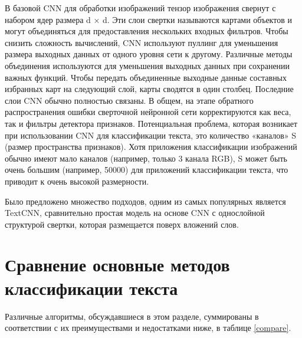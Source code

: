 В базовой CNN для обработки изображений тензор изображения свернут с набором ядер размера d × d. Эти слои свертки называются картами объектов и могут объединяться для предоставления нескольких входных фильтров\cite{168}. Чтобы снизить сложность вычислений, CNN используют пуллинг для уменьшения размера выходных данных от одного уровня сети к другому. Различные методы объединения используются для уменьшения выходных данных при сохранении важных функций\cite{188}. Чтобы передать объединенные выходные данные составных избранных карт на следующий слой, карты сводятся в один столбец. Последние слои CNN обычно полностью связаны. В общем, на этапе обратного распространения ошибки сверточной нейронной сети корректируются как веса, так и фильтры детектора признаков. Потенциальная проблема, которая возникает при использовании CNN для классификации текста, это количество «каналов» S (размер пространства признаков). Хотя приложения классификации изображений обычно имеют мало каналов (например, только 3 канала RGB), S может быть очень большим (например, 50000) для приложений классификации текста, что приводит к очень высокой размерности\cite{187}. 

Было предложено множество подходов, одним из самых популярных является TextCNN\cite{69}, сравнительно простая модель на основе CNN с однослойной структурой свертки, которая размещается поверх вложений слов.

\section{Сравнение основные методов классификации текста}

Различные алгоритмы, обсуждавшиеся в этом разделе, суммированы в соответствии с их преимуществами и недостатками ниже, в таблице \ref{compare}.

